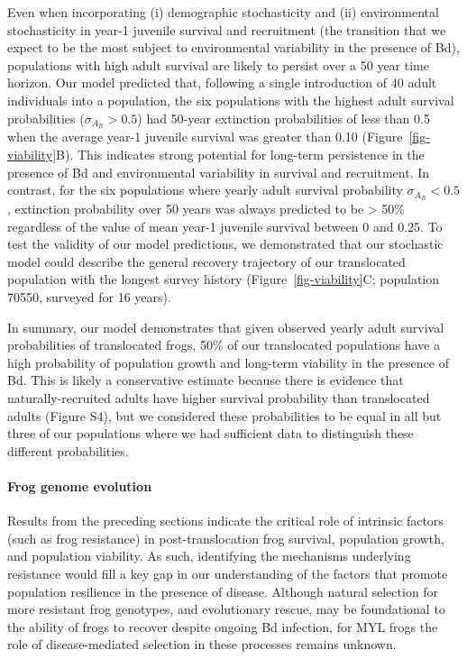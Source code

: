 \documentclass[9pt,twocolumn,twoside,lineno]{pnas-new}
\begin{document}
Even when incorporating (i) demographic stochasticity and (ii)
environmental stochasticity in year-1 juvenile survival and recruitment
(the transition that we expect to be the most subject to environmental
variability in the presence of Bd), populations with high adult survival
are likely to persist over a 50 year time horizon. Our model predicted
that, following a single introduction of 40 adult individuals into a
population, the six populations with the highest adult survival
probabilities (\(\sigma_{A_R} > 0.5\)) had 50-year extinction
probabilities of less than 0.5 when the average year-1 juvenile survival
was greater than 0.10 (Figure~\ref{fig-viability}B). This indicates
strong potential for long-term persistence in the presence of Bd and
environmental variability in survival and recruitment. In contrast, for
the six populations where yearly adult survival probability
\(\sigma_{A_R} < 0.5\), extinction probability over 50 years was always
predicted to be \textgreater{} 50\% regardless of the value of mean
year-1 juvenile survival between 0 and 0.25. To test the validity of our
model predictions, we demonstrated that our stochastic model could
describe the general recovery trajectory of our translocated population
with the longest survey history (Figure~\ref{fig-viability}C;
population 70550, surveyed for 16 years).

In summary, our model demonstrates that given observed yearly adult
survival probabilities of translocated frogs, 50\% of our translocated
populations have a high probability of population growth and long-term
viability in the presence of Bd. This is likely a conservative estimate
because there is evidence that naturally-recruited adults have higher
survival probability than translocated adults
(Figure S4), but we considered these
probabilities to be equal in all but three of our populations where we
had sufficient data to distinguish these different probabilities.

\hypertarget{frog-genome-evolution}{%
\paragraph{Frog genome evolution}\label{frog-genome-evolution}}

Results from the preceding sections indicate the critical role of
intrinsic factors (such as frog resistance) in post-translocation frog
survival, population growth, and population viability. As such,
identifying the mechanisms underlying resistance would fill a key gap in
our understanding of the factors that promote population resilience in
the presence of disease. Although natural selection for more resistant
frog genotypes, and evolutionary rescue, may be foundational to the
ability of frogs to recover despite ongoing Bd infection, for MYL frogs
the role of disease-mediated selection in these processes remains
unknown.
\end{document}
